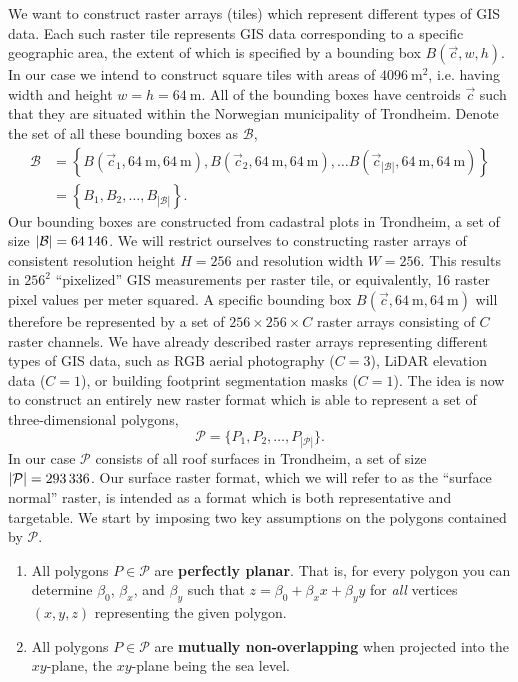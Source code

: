 We want to construct raster arrays (tiles) which represent different types of GIS data.
Each such raster tile represents GIS data corresponding to a specific geographic area, the extent of which is specified by a bounding box $B(\vec{c}, w, h)$.
In our case we intend to construct square tiles with areas of $\SI{4096}{\meter\squared}$, i.e. having width and height $w = h = \SI{64}{\meter}$.
All of the bounding boxes have centroids $\vec{c}$ such that they are situated within the Norwegian municipality of Trondheim.
Denote the set of all these bounding boxes as $\mathcal{B}$,
%
\begin{align*}
  \mathcal{B}
  &=
  \left\{
    B(\vec{c}_1, \SI{64}{\meter}, \SI{64}{\meter}),
    B(\vec{c}_2, \SI{64}{\meter}, \SI{64}{\meter}),
    \dots
    B(\vec{c}_{|\mathcal{B}|}, \SI{64}{\meter}, \SI{64}{\meter})
  \right\}
  \\
  &=
  \left\{
    B_1,
    B_2,
    \dots,
    B_{|\mathcal{B}|}
  \right\}.
\end{align*}
%
Our bounding boxes are constructed from cadastral plots in Trondheim, a set of size $|\mathcal{B}| = \num{64146}$.
We will restrict ourselves to constructing raster arrays of consistent resolution height $H = 256$ and resolution width $W = 256$.
This results in $256^2$ \enquote{pixelized} GIS measurements per raster tile, or equivalently, \num{16} raster pixel values per meter squared.
A specific bounding box $B(\vec{c}, \SI{64}{\meter}, \SI{64}{\meter})$ will therefore be represented by a set of $256 \times 256 \times C$ raster arrays consisting of $C$ raster channels.
We have already described raster arrays representing different types of GIS data, such as RGB aerial photography ($C = 3$), LiDAR elevation data ($C = 1$), or building footprint segmentation masks ($C = 1$).
The idea is now to construct an entirely new raster format which is able to represent a set of three-dimensional polygons,
\begin{equation*}
  \mathcal{P}
  =
  \{
    P_1,
    P_2,
    \dots,
    P_{|\mathcal{P}|}
  \}.
\end{equation*}
In our case $\mathcal{P}$ consists of all roof surfaces in Trondheim, a set of size $|\mathcal{P}| = \num{293336}$.
Our surface raster format, which we will refer to as the \enquote{surface normal} raster, is intended as a format which is both representative and targetable.
We start by imposing two key assumptions on the polygons contained by $\mathcal{P}$.
\begin{enumerate}[label=\bfseries\sffamily A\arabic*, ref=A\arabic*]
  \item\label{itm:flat} All polygons $P \in \mathcal{P}$ are \textbf{perfectly planar}.
    That is, for every polygon you can determine $\beta_0$, $\beta_x$, and $\beta_y$ such that $z = \beta_0 + \beta_x x + \beta_y y$ for \emph{all} vertices $(x, y, z)$ representing the given polygon.
  \item\label{itm:non-overlapping} All polygons $P \in \mathcal{P}$ are \textbf{mutually non-overlapping} when projected into the $xy$-plane, the $xy$-plane being the sea level.
\end{enumerate}
